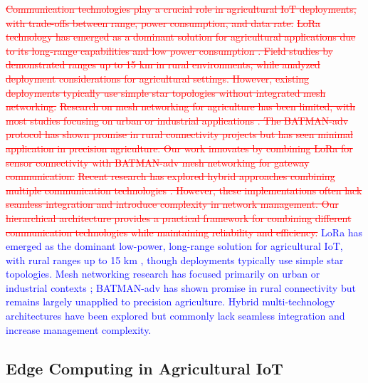 \documentclass[pdflatex,sn-mathphys-num]{sn-jnl}
\theoremstyle{thmstyleone}
\theoremstyle{thmstyletwo}
\theoremstyle{thmstylethree}
\begin{document}
{\textcolor{red}{\sout{Communication technologies play a crucial role in agricultural IoT deployments, with trade-offs between range, power consumption, and data rate.}}
\textcolor{red}{\sout{LoRa technology has emerged as a dominant solution for agricultural applications due to its long-range capabilities and low power consumption . Field studies by demonstrated ranges up to 15 km in rural environments, while analyzed deployment considerations for agricultural settings. However, existing deployments typically use simple star topologies without integrated mesh networking.}}
\textcolor{red}{\sout{Research on mesh networking for agriculture has been limited, with most studies focusing on urban or industrial applications . The BATMAN-adv protocol has shown promise in rural connectivity projects but has seen minimal application in precision agriculture. Our work innovates by combining LoRa for sensor connectivity with BATMAN-adv mesh networking for gateway communication.}}
\textcolor{red}{\sout{Recent research has explored hybrid approaches combining multiple communication technologies . However, these implementations often lack seamless integration and introduce complexity in network management. Our hierarchical architecture provides a practical framework for combining different communication technologies while maintaining reliability and efficiency.}}
\textcolor{blue}{LoRa has emerged as the dominant low-power, long-range solution for agricultural IoT, with rural ranges up to 15 km \cite{adelantado2017understanding, li2020performance, raj2017comprehensive}, though deployments typically use simple star topologies. Mesh networking research has focused primarily on urban or industrial contexts \cite{akylidiz2005wireless}; BATMAN-adv has shown promise in rural connectivity \cite{schmidt2010b.a.t.m.a.n.} but remains largely unapplied to precision agriculture. Hybrid multi-technology architectures have been explored \cite{chettri2020comprehensive} but commonly lack seamless integration and increase management complexity.}

\subsection{Edge Computing in Agricultural IoT}
\label{subsec:edge_computing}

}
\end{document}
